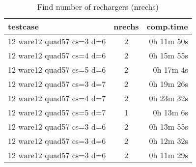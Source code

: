 \documentclass{article}
\begin{document}
\begin{table}[h!]
  \begin{center}
    \caption{Find number of rechargers (nrechs)}
    \label{tab:table1}
    \begin{tabular}{l|c|r}
      \textbf{testcase} & \textbf{nrechs} & \textbf{comp.time}\\
      \hline
       12 ware12 quad57 cs=3 d=6 & 2 & 0h 11m 50s \\
       12 ware12 quad57 cs=4 d=6 & 2 & 0h 15m 55s \\
       12 ware12 quad57 cs=5 d=6 & 2 & 0h 17m 4s \\
       12 ware12 quad57 cs=3 d=7 & 2 & 0h 19m 26s \\
       12 ware12 quad57 cs=4 d=7 & 2 & 0h 23m 32s \\
       12 ware12 quad57 cs=5 d=7 & 1 & 0h 13m 6s \\
       12 ware12 quad57 cs=3 d=6 & 2 & 0h 13m 55s \\
       12 ware12 quad57 cs=3 d=6 & 2 & 0h 12m 32s \\
       12 ware12 quad57 cs=3 d=6 & 2 & 0h 11m 29s \\
    \end{tabular}
  \end{center}
\end{table}
\end{document}
